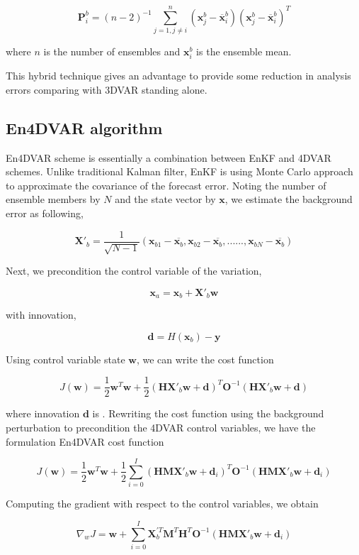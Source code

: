 \documentclass[a4,12pt]{article}
\begin{document}
$$\textbf{P}^{b}_{i} = (n-2)^{-1} \sum_{j=1, j \ne i}^{n}(\textbf{x}_{j}^{b} - \overline{\textbf{x}}_{i}^{b})(\textbf{x}_{j}^{b} - \overline{\textbf{x}}_{i}^{b})^{T}$$

where $n$ is the number of ensembles and  $\textbf{x}_{i}^{b}$ is the ensemble mean.

This hybrid technique gives an advantage to provide some reduction in analysis errors comparing with 3DVAR standing alone.

\subsection{En4DVAR algorithm}

En4DVAR scheme is essentially a combination between EnKF and 4DVAR schemes. Unlike traditional Kalman filter, EnKF is using Monte Carlo approach to approximate the covariance of the forecast error. Noting the number of ensemble members by $N$ and the state vector by $\textbf{x}$, we estimate the background error as following,

$$\textbf{X}'_{b}=\frac{1}{\sqrt{N-1}}(\textbf{x}_{b1}-\overline{\textbf{x}_{b}},\textbf{x}_{b2}-\overline{\textbf{x}_{b}},......,\textbf{x}_{bN}-\overline{\textbf{x}_{b}})$$

Next, we precondition the control variable of the variation,

$$\textbf{x}_{a} = \textbf{x}_{b} + \textbf{X}'_{b}\textbf{w}$$

with innovation,

$$\textbf{d} = H(\textbf{x}_{b})-\textbf{y}$$

Using control variable state $\textbf{w}$, we can write the cost function

$$J(\textbf{w}) = \frac{1}{2} \textbf{w}^{T}\textbf{w} + \frac{1}{2}(\textbf{H}\textbf{X}'_{b}\textbf{w}+\textbf{d})^{T}\textbf{O}^{-1}(\textbf{H}\textbf{X}'_{b}\textbf{w}+\textbf{d})$$

where innovation $\textbf{d}$ is . Rewriting the cost function using the background perturbation to precondition the 4DVAR control variables, we have the formulation En4DVAR cost function

$$J(\textbf{w}) = \frac{1}{2} \textbf{w}^{T}\textbf{w} + \frac{1}{2}\sum_{i=0}^{I}(\textbf{HM}\textbf{X}'_{b}\textbf{w} + \textbf{d}_{i})^{T}\textbf{O}^{-1}(\textbf{HMX}'_{b}\textbf{w}+\textbf{d}_{i})$$

Computing the gradient with respect to the control variables, we obtain

$$\nabla_{w}J = \textbf{w} + \sum_{i=0}^{I} \textbf{X}_{b}^{'T}\textbf{M}^{T}\textbf{H}^{T}\textbf{O}^{-1}(\textbf{HMX}'_{b}\textbf{w}+\textbf{d}_{i})$$
\end{document}
